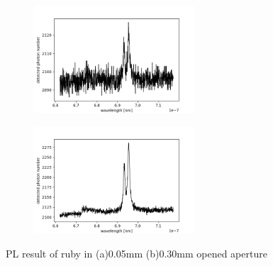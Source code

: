 \documentclass{article}
\begin{document}
 \begin{figure}[ht]
  \centering
  \begin{subfigure}[b]{6cm}
      \centering
      \includegraphics[width=6cm]{../results/Ruby s5-1_raw_fig.png}
      \caption{}
  \end{subfigure}
  \hfill
  \begin{subfigure}[b]{6cm}
      \centering
      \includegraphics[width=6cm]{../results/Ruby s30-1_raw_fig.png}
      \caption{}
  \end{subfigure}
  \hfill
  \caption{PL result of ruby in (a)0.05mm (b)0.30mm opened aperture}
  \label{fig:s5_s30_difference}
\end{figure}
 
\end{document}
